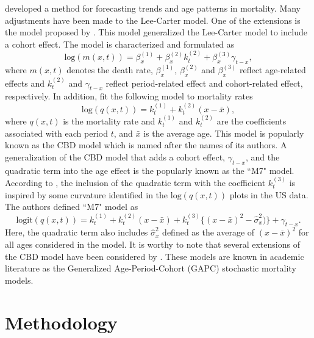 \documentclass[11pt,letterpaper]{article}
\numberwithin{equation}{section}
\begin{document}
\cite{Lee+Carter:1992} developed a method for forecasting trends and age patterns in mortality.  Many adjustments have been made to the Lee-Carter model. One of the extensions is the model proposed by \cite{Renshaw+Haberman:2006}. This model generalized the Lee-Carter model to include a cohort effect. The model is characterized and formulated as
\begin{equation}\label{eq:p2}
\text{log}(m(x,t))=\beta_x^{(1)}+ \beta_x^{(2)}k_t^{(2)}+ \beta_x^{(3)}\gamma_{t-x},
\end{equation}
where $m(x,t)$ denotes the death rate, $\beta_x^{(1)}$, $\beta_x^{(2)}$ and $\beta_x^{(3)}$ reflect age-related effects and  $k_t^{(2)}$ and $\gamma_{t-x}$ reflect period-related effect  and cohort-related effect, respectively. In addition, \cite{Cairns+Blake+Dowd:2006} fit the following model to mortality rates
\begin{equation}\label{eq:p3}
\text{log}(q(x,t))=k_t^{(1)}+ k_t^{(2)}(x - \bar{x}),
\end{equation}
where $q(x,t)$ is the mortality rate and $k_t^{(1)}$ and $k_t^{(2)}$ are the coefficients associated with each period $t$, and $\bar{x}$ is the average age. This model is popularly known as the CBD model which is named after the names of its authors. A generalization of the CBD model that adds a cohort effect, $\gamma_{t-x}$, and the quadratic term into the age effect is the popularly known as the ``M7" model. According to \cite{Cairns+Blake+Dowd+Coughlan+Epstein+Khalaf+Allah:2011}, the inclusion of the quadratic term with the coefficient $k_t^{(3)}$ is inspired by some curvature identified in the $\text{log}(q(x,t))$ plots in the US data. The authors defined ``M7" model as
\begin{equation}\label{eq:p4}
\text{logit}(q(x,t))=k_t^{(1)}+ k_t^{(2)}(x - \bar{x}) + k_t^{(3)}\{(x - \bar{x})^{2} - \hat\sigma_x^{2})\} + \gamma_{t-x}.
\end{equation}
Here, the quadratic term also includes $\hat\sigma_x^{2}$ defined as the average of $(x - \bar{x})^{2}$ for all ages considered in the model. It is worthy to note that several extensions of the CBD model have been considered by \cite{Cairns+Blake+Dowd+Coughlan+Epstein+Ong+Balevich:2009}. These models are known in academic literature as the Generalized Age-Period-Cohort (GAPC) stochastic mortality models.

\section{Methodology}\label{sec:methodology}
\end{document}
